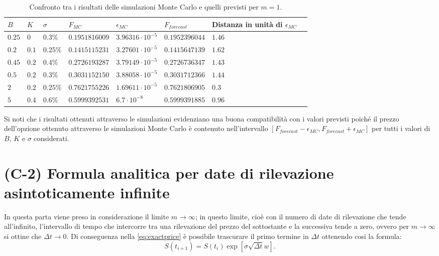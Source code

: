 \begin{table}[t]
\small
\centering
\begin{tabular}{|l|l|l|l|l|l|l|l|}
\hline
$B$ & $K$ & $\sigma$ & $F_{MC}$ & $\epsilon_{MC}$ & $F_{forecast}$ & Distanza in unità di $\epsilon_{MC}$ \\
\hline \hline
$0.25$ & $0$ & $0.3 \%$ & $0.1951816009$ & $3.96316 \cdot 10^{-5}$ & $0.1952396044$ & $1.46$\\ \hline
$0.2$ & $0.1$ & $0.25\%$ & $0.1415115231$ & $3.27601 \cdot 10^{-5}$ & $0.1415647139$ & $1.62$\\ \hline
$0.45$ & $0.2$ & $0.4 \%$ & $0.2726193287$ & $3.79149 \cdot 10^{-5}$ & $0.2726736347$ & $1.43$\\ \hline
$0.5$ & $0.2$ & $0.3\%$ & $0.3031152150$ & $3.88058 \cdot 10^{-5}$ & $0.3031712366$ & $1.44$\\ \hline
$2$ & $0.2$ & $0.25 \%$ & $0.7621755226$ & $1.69611 \cdot 10^{-5}$ & $0.7621806905$ & $0.3$\\ \hline
$5$ & $0.4$ & $0.6 \%$ & $0.5999392531$ & $6.7 \cdot 10^{-8}$ & $0.5999391885$ & $0.96$\\ \hline
\end{tabular}
\caption{Confronto tra i risultati delle simulazioni Monte Carlo e quelli previsti per $m=1$.}
\label{tab:Teo-MC_m}
\end{table}

Si noti che i risultati ottenuti attraverso le simulazioni evidenziano una buona compatibilità con i valori previsti poiché il prezzo dell'opzione ottenuto attraverso le simulazioni Monte Carlo è contenuto nell'intervallo $[F_{forecast}-\epsilon_{MC},F_{forecast}+\epsilon_{MC}]$ per tutti i valori di $B$, $K$ e $\sigma$ considerati.


\section{(C-2) Formula analitica per date di rilevazione asintoticamente infinite}

In questa parta viene preso in considerazione il limite $m \rightarrow \infty$; in questo limite, cioè con il numero di date di rilevazione che tende all'infinito, l'intervallo di tempo che intercorre tra una rilevazione del prezzo del sottostante e la successiva tende a zero, ovvero per $m \rightarrow \infty$ si ottine che $\Delta t \rightarrow 0$. Di conseguenza nella \eqref{eq:exactprice} è possibile trascurare il primo termine in $\Delta t$ ottenendo cosi la formula:
\begin{equation}
     S(t_{i+1}) = S(t_i) \exp{\left[ \sigma \sqrt{\Delta t} w\right]}.
\end{equation}

